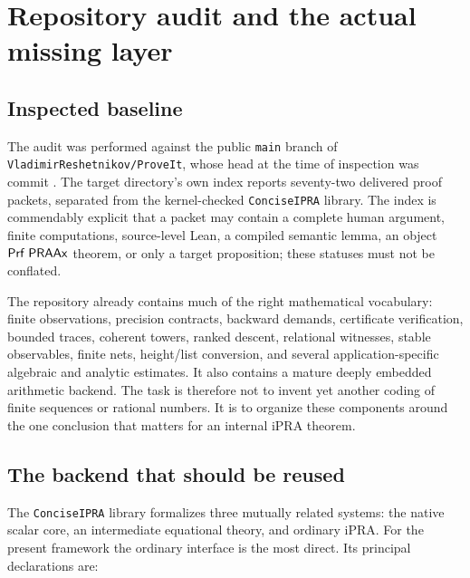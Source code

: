 \section{Repository audit and the actual missing layer}
\label{sec:audit}

\subsection{Inspected baseline}

The audit was performed against the public \texttt{main} branch of
\texttt{VladimirReshetnikov/ProveIt}, whose head at the time of inspection was
commit .
The target directory's own index reports seventy-two delivered proof packets,
separated from the kernel-checked \texttt{ConciseIPRA} library.  The index is
commendably explicit that a packet may contain a complete human argument,
finite computations, source-level Lean, a compiled semantic lemma, an object
\(\mathsf{Prf}\;\mathsf{PRAAx}\) theorem, or only a target proposition; these statuses must not
be conflated.

The repository already contains much of the right mathematical vocabulary:
finite observations, precision contracts, backward demands, certificate
verification, bounded traces, coherent towers, ranked descent, relational
witnesses, stable observables, finite nets, height/list conversion, and
several application-specific algebraic and analytic estimates.  It also
contains a mature deeply embedded arithmetic backend.  The task is therefore
not to invent yet another coding of finite sequences or rational numbers.  It
is to organize these components around the one conclusion that matters for an
internal iPRA theorem.

\subsection{The backend that should be reused}

The \texttt{ConciseIPRA} library formalizes three mutually related systems:
the native scalar core, an intermediate equational theory, and ordinary iPRA.
For the present framework the ordinary interface is the most direct.  Its
principal declarations are:

